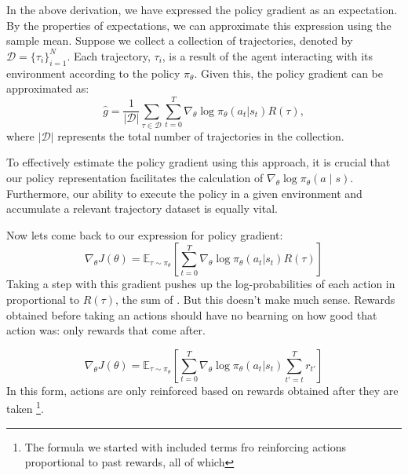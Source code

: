 
In the above derivation, we have expressed the policy gradient as an expectation. By the properties of expectations, we can approximate this expression using the sample mean. Suppose we collect a collection of trajectories, denoted by $\mathcal{D} = \{ \tau_i \}_{i=1}^{N}$. Each trajectory, $\tau_i$, is a result of the agent interacting with its environment according to the policy $\pi_{\theta}$. Given this, the policy gradient can be approximated as:
\[
\hat{g} = \frac{1}{|\mathcal{D}|} \sum_{\tau \in \mathcal{D}} \sum_{t=0}^{T} \nabla_{\theta} \log \pi_{\theta}(a_t|s_t) R(\tau),
\]
where $|\mathcal{D}|$ represents the total number of trajectories in the collection.

To effectively estimate the policy gradient using this approach, it is crucial that our policy representation facilitates the calculation of $\nabla_{\theta} \log \pi_{\theta}(a \mid s)$. Furthermore, our ability to execute the policy in a given environment and accumulate a relevant trajectory dataset is equally vital.

Now lets come back to our expression for policy gradient:
$$
\nabla_{\theta} J(\theta) = \mathbb{E}_{\tau \sim \pi_\theta} \left[\sum_{t=0}^{T} \nabla_{\theta} \log \pi_{\theta}(a_t|s_t) R(\tau) \right]
$$
Taking a step with this gradient pushes up the log-probabilities of each action in proportional to $R(\tau)$, the sum of . But this doesn't make much sense. Rewards obtained before taking an actions should have no bearning on how good that action was: only rewards that come after.

$$
\nabla_{\theta} J(\theta) = \mathbb{E}_{\tau \sim \pi_\theta} \left[\sum_{t=0}^{T} \nabla_{\theta} \log \pi_{\theta}(a_t|s_t) \sum_{t' = t}^{T} r_{t'} \right]
$$
In this form, actions are only reinforced based on rewards obtained after they are taken \footnote{The formula we started with included terms fro reinforcing actions proportional to past rewards, all of which}. 

